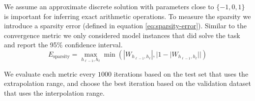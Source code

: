 We assume an approximate discrete solution with parameters close to $\{-1, 0, 1\}$ is important for inferring exact arithmetic operations.
To measure the sparsity we introduce a sparsity error (defined in equation \ref{eq:sparsity-error}).
Similar to the convergence metric we only considered model instances that did solve the task and report the 95\% confidence interval.
\begin{equation}
E_\mathrm{sparsity} = \max_{h_{\ell-1}, h_{\ell}} \min(|W_{h_{\ell-1},h_\ell}|, |1 - |W_{h_{\ell-1},h_\ell}||)
\label{eq:sparsity-error}
\end{equation}

We evaluate each metric every $1000$ iterations based on the test set that uses the extrapolation range, and choose the best iteration based on the validation dataset that uses the interpolation range.






